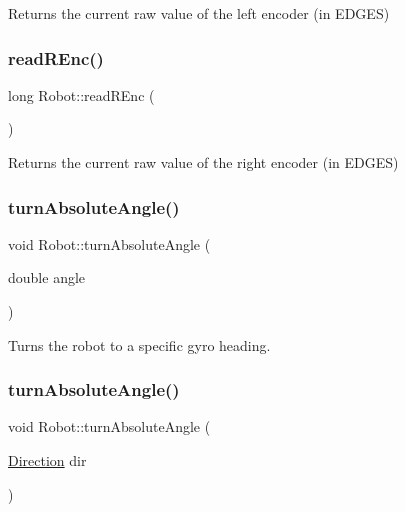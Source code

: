 Returns the current raw value of the left encoder (in E\+D\+G\+ES) \mbox{\label{classRobot_a2bc5b4f70b378e51c9bef971d24c3465}} 
\subsubsection{\texorpdfstring{read\+R\+Enc()}{readREnc()}}
{\footnotesize\ttfamily long Robot\+::read\+R\+Enc (\begin{DoxyParamCaption}{ }\end{DoxyParamCaption})\hspace{0.3cm}{\ttfamily [inline]}}

Returns the current raw value of the right encoder (in E\+D\+G\+ES) \mbox{\label{classRobot_aae2c42217eb706f1399d3092ca732847}} 
\subsubsection{\texorpdfstring{turn\+Absolute\+Angle()}{turnAbsoluteAngle()}\hspace{0.1cm}{\footnotesize\ttfamily [1/2]}}
{\footnotesize\ttfamily void Robot\+::turn\+Absolute\+Angle (\begin{DoxyParamCaption}\item[{double}]{angle }\end{DoxyParamCaption})\hspace{0.3cm}{\ttfamily [inline]}}

Turns the robot to a specific gyro heading. \mbox{\label{classRobot_aa6eba7dd97dbeff57c1ed23ba4fafad6}} 
\subsubsection{\texorpdfstring{turn\+Absolute\+Angle()}{turnAbsoluteAngle()}\hspace{0.1cm}{\footnotesize\ttfamily [2/2]}}
{\footnotesize\ttfamily void Robot\+::turn\+Absolute\+Angle (\begin{DoxyParamCaption}\item[{\hyperlink{util_8h_a92e22a126ad6bf9d255b517e70d083f6}{Direction}}]{dir }\end{DoxyParamCaption})\hspace{0.3cm}{\ttfamily [inline]}}

